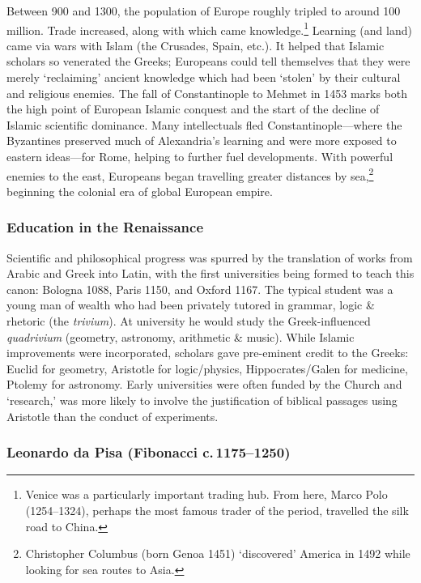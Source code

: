 Between 900 and 1300, the population of Europe roughly tripled to around 100 million. Trade increased, along with which came knowledge.\footnote{%
	Venice was a particularly important trading hub. From here, Marco Polo (1254--1324), perhaps the most famous trader of the period, travelled the silk road to China.%
}
Learning (and land) came via wars with Islam (the Crusades, Spain, etc.). It helped that Islamic scholars so venerated the Greeks; Europeans could tell themselves that they were merely `reclaiming' ancient knowledge which had been `stolen' by their cultural and religious enemies. The fall of Constantinople to Mehmet in 1453 marks both the high point of European Islamic conquest and the start of the decline of Islamic scientific dominance. Many intellectuals fled Constantinople---where the Byzantines preserved much of Alexandria's learning and were more exposed to eastern ideas---for Rome, helping to further fuel developments. With powerful enemies to the east, Europeans began travelling greater distances by sea,\footnote{%
	Christopher Columbus (born Genoa 1451) `discovered' America in 1492 while looking for sea routes to Asia.%
}
beginning the colonial era of global European empire.


\subsubsection*{Education in the Renaissance}

Scientific and philosophical progress was spurred by the translation of works from Arabic and Greek into Latin, with the first universities being formed to teach this canon: Bologna 1088, Paris 1150, and Oxford 1167. The typical student was a young man of wealth who had been privately tutored in grammar, logic \& rhetoric (the \emph{trivium}). At university he would study the Greek-influenced \emph{quadrivium} (geometry, astronomy, arithmetic \& music). While Islamic improvements were incorporated, scholars gave pre-eminent credit to the Greeks: Euclid for geometry, Aristotle for logic/physics, Hippocrates/Galen for medicine, Ptolemy for astronomy. Early universities were often funded by the Church and `research,' was more likely to involve the justification of biblical passages using Aristotle than the conduct of experiments.


\subsubsection*{Leonardo da Pisa (Fibonacci c.\,1175--1250)}


